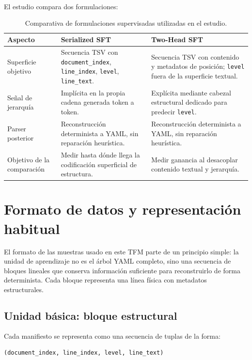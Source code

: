 El estudio compara dos formulaciones:

\begin{table}[htbp]
\centering
\caption{Comparativa de formulaciones supervisadas utilizadas en el estudio.}
\label{tab:ch4_formulations}
\begin{tabular}{p{}p{}p{}}
\toprule
\textbf{Aspecto} & \textbf{Serialized SFT} & \textbf{Two-Head SFT} \\
\midrule
Superficie objetivo & Secuencia TSV con \texttt{document\_index}, \texttt{line\_index}, \texttt{level}, \texttt{line\_text}. & Secuencia TSV con contenido
y metadatos de posición; \texttt{level} fuera de la superficie textual. \\
Señal de jerarquía & Implícita en la propia cadena generada token a token. & Explícita mediante cabezal estructural dedicado para predecir \texttt{level}. \\
Parser posterior & Reconstrucción determinista a YAML, sin reparación heurística. & Reconstrucción determinista a YAML, sin reparación heurística. \\
Objetivo de la comparación & Medir hasta dónde llega la codificación superficial de estructura. & Medir ganancia al desacoplar contenido textual y jerarquía. \\
\bottomrule
\end{tabular}
\end{table}

\section{Formato de datos y representación habitual}
\label{sec:ch4_contract}

El formato de las muestras usado en este TFM parte de un principio simple: la unidad de aprendizaje no es el árbol YAML completo, sino una secuencia de bloques lineales
que conserva información suficiente para reconstruirlo de forma determinista. Cada bloque representa una línea física con metadatos estructurales.

\subsection{Unidad básica: bloque estructural}
\label{sec:ch4_block_unit}

Cada manifiesto se representa como una secuencia de tuplas de la forma:

\begin{center}
\texttt{(document\_index, line\_index, level, line\_text)}
\end{center}

